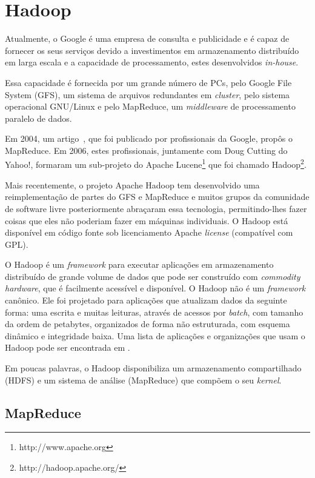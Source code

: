 \chapter{Hadoop}

Atualmente, o Google é uma empresa de consulta e publicidade e é capaz de fornecer os seus serviços devido a investimentos em armazenamento distribuído em larga escala e a capacidade de processamento, estes desenvolvidos \emph{in-house}.

Essa capacidade é fornecida por um grande número de PCs, pelo Google File System (GFS), um sistema de arquivos redundantes em \emph{cluster}, pelo sistema operacional GNU/Linux e pelo MapReduce, um \emph{middleware} de processamento paralelo de dados.

Em 2004, um artigo~\cite{Dean:2004}, que foi publicado por
profissionais da Google, propôs o MapReduce. Em 2006, estes
profissionais, juntamente com Doug Cutting do Yahoo!, formaram um
sub-projeto do Apache Lucene\footnote{http://www.apache.org} que foi
chamado Hadoop\footnote{http://hadoop.apache.org/}.

Mais recentemente, o projeto Apache Hadoop tem desenvolvido uma
reimplementação de partes do GFS e MapReduce e muitos grupos da
comunidade de software livre posteriormente abraçaram essa tecnologia,
permitindo-lhes fazer coisas que eles não poderiam fazer em máquinas
individuais. O Hadoop está disponível em código fonte sob
licenciamento Apache \emph{license} (compatível com GPL).

O Hadoop é um \emph{framework} para executar aplicações em
armazenamento distribuído de grande volume de dados que pode ser
construído com \emph{commodity hardware}, que é facilmente acessível e
disponível.  O Hadoop não é um \emph{framework} canônico. Ele foi
projetado para aplicações que atualizam dados da seguinte forma: uma
escrita e muitas leituras, através de acessos por \emph{batch}, com
tamanho da ordem de petabytes, organizados de forma não estruturada,
com esquema dinâmico e integridade baixa.  Uma lista de aplicações e
organizações que usam o Hadoop pode ser encontrada em
\cite{HadoopWiki:2010}.

Em poucas palavras, o Hadoop disponibiliza um armazenamento
compartilhado (HDFS) e um sistema de análise (MapReduce) que compõem o
seu \emph{kernel}.

\section{MapReduce}

